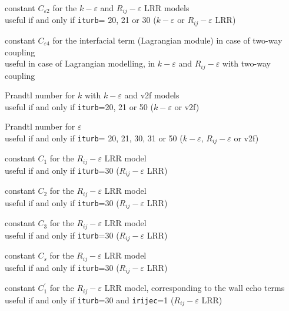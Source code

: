 {constant $C_{\varepsilon 2}$ for the $k-\varepsilon$ and
$R_{ij}-\varepsilon$ LRR models\\
useful if and only if {\tt iturb}= 20, 21 or 30
($k-\varepsilon$ or $R_{ij}-\varepsilon$ LRR)}


{constant $C_{\varepsilon 4}$ for the interfacial term (Lagrangian module) in
case of two-way coupling\\
useful in case of Lagrangian modelling, in $k-\varepsilon$ and $R_{ij}-\varepsilon$
with two-way coupling}

{Prandtl number for $k$ with $k-\varepsilon$ and v2f models\\
useful if and only if {\tt iturb}=20, 21 or 50
($k-\varepsilon$ or v2f)}

{Prandtl number for $\varepsilon$\\
useful if and only if {\tt iturb}= 20,
21, 30, 31 or 50 ($k-\varepsilon$, $R_{ij}-\varepsilon$ or v2f)}


{constant $C_1$ for the $R_{ij}-\varepsilon$ LRR model\\
useful if and only if {\tt iturb}=30
($R_{ij}-\varepsilon$ LRR)}

{constant $C_2$ for the $R_{ij}-\varepsilon$ LRR model\\
useful if and only if {\tt iturb}=30
($R_{ij}-\varepsilon$ LRR)}

{constant $C_3$ for the $R_{ij}-\varepsilon$ LRR model\\
useful if and only if {\tt iturb}=30
($R_{ij}-\varepsilon$ LRR)}

{constant $C_s$ for the $R_{ij}-\varepsilon$ LRR model\\
useful if and only if {\tt iturb}=30
($R_{ij}-\varepsilon$ LRR)}

{constant $C_1^\prime$ for the $R_{ij}-\varepsilon$ LRR model, corresponding to
the wall echo terms\\
useful if and only if {\tt iturb}=30
and {\tt irijec}=1
($R_{ij}-\varepsilon$ LRR)}

